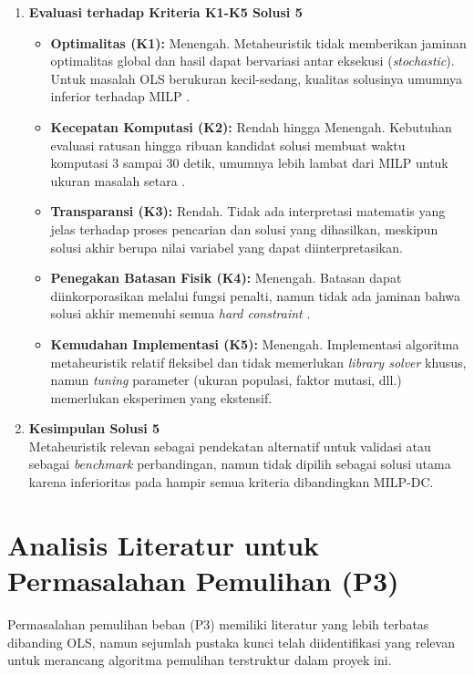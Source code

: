 \begin{enumerate}
\item[b.] \textbf{Evaluasi terhadap Kriteria K1-K5 Solusi 5}
\begin{itemize}
    \item[i.] \textbf{Optimalitas (K1):} Menengah. Metaheuristik tidak memberikan jaminan optimalitas global dan hasil dapat bervariasi antar eksekusi (\textit{stochastic}). Untuk masalah OLS berukuran kecil-sedang, kualitas solusinya umumnya inferior terhadap MILP \cite{Ahmadipour2023}.
    \item[ii.] \textbf{Kecepatan Komputasi (K2):} Rendah hingga Menengah. Kebutuhan evaluasi ratusan hingga ribuan kandidat solusi membuat waktu komputasi 3 sampai 30 detik, umumnya lebih lambat dari MILP untuk ukuran masalah setara \cite{Qi2025}.
    \item[iii.] \textbf{Transparansi (K3):} Rendah. Tidak ada interpretasi matematis yang jelas terhadap proses pencarian dan solusi yang dihasilkan, meskipun solusi akhir berupa nilai variabel yang dapat diinterpretasikan.
    \item[iv.] \textbf{Penegakan Batasan Fisik (K4):} Menengah. Batasan dapat diinkorporasikan melalui fungsi penalti, namun tidak ada jaminan bahwa solusi akhir memenuhi semua \textit{hard constraint} \cite{Ahmadipour2023}.
    \item[v.] \textbf{Kemudahan Implementasi (K5):} Menengah. Implementasi algoritma metaheuristik relatif fleksibel dan tidak memerlukan \textit{library solver} khusus, namun \textit{tuning} parameter (ukuran populasi, faktor mutasi, dll.) memerlukan eksperimen yang ekstensif.
\end{itemize}
 
\item[c.] \textbf{Kesimpulan Solusi 5} \\
Metaheuristik relevan sebagai pendekatan alternatif untuk validasi atau sebagai \textit{benchmark} perbandingan, namun tidak dipilih sebagai solusi utama karena inferioritas pada hampir semua kriteria dibandingkan MILP-DC.
\end{enumerate}

\section{Analisis Literatur untuk Permasalahan Pemulihan (P3)}
\label{sec:Analisis_Literatur_Pemulihan}

Permasalahan pemulihan beban (P3) memiliki literatur yang lebih terbatas dibanding OLS, namun sejumlah pustaka kunci telah diidentifikasi yang relevan untuk merancang algoritma pemulihan terstruktur dalam proyek ini.


